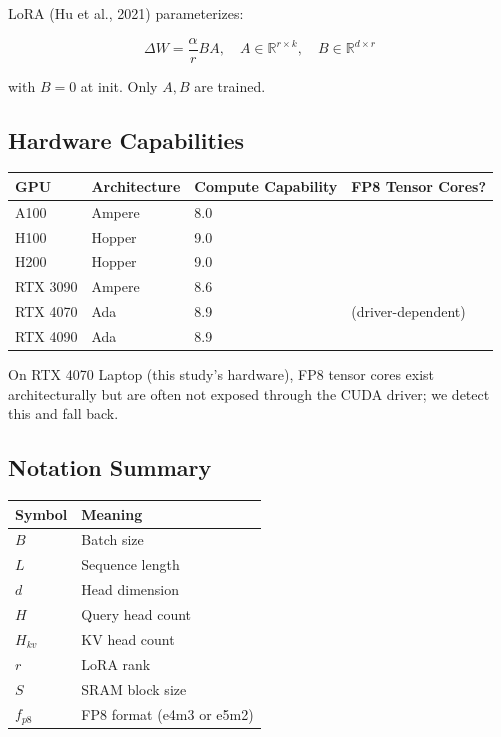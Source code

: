 LoRA (Hu et al., 2021) parameterizes:

\[
\Delta W = \frac{\alpha}{r} BA, \quad
A \in \mathbb{R}^{r \times k}, \quad
B \in \mathbb{R}^{d \times r}
\tag{3.4}
\]

with $B = 0$ at init. Only $A, B$ are trained.

\subsection{Hardware Capabilities}

\begin{table}[H]
\centering
\small
\begin{tabular}{llll}
\toprule
\textbf{GPU} & \textbf{Architecture} & \textbf{Compute Capability} & \textbf{FP8 Tensor Cores?} \\
\midrule
A100 & Ampere & 8.0 &  \\
H100 & Hopper & 9.0 &  \\
H200 & Hopper & 9.0 &  \\
RTX 3090 & Ampere & 8.6 &  \\
RTX 4070 & Ada & 8.9 & (driver-dependent) \\
RTX 4090 & Ada & 8.9 &  \\
\bottomrule
\end{tabular}
\end{table}

On RTX 4070 Laptop (this study's hardware), FP8 tensor cores exist 
architecturally but are often not exposed through the CUDA driver; we 
detect this and fall back.

\subsection{Notation Summary}

\begin{table}[H]
\centering
\small
\begin{tabular}{ll}
\toprule
\textbf{Symbol} & \textbf{Meaning} \\
\midrule
$B$ & Batch size \\
$L$ & Sequence length \\
$d$ & Head dimension \\
$H$ & Query head count \\
$H_{kv}$ & KV head count \\
$r$ & LoRA rank \\
$S$ & SRAM block size \\
$f_{p8}$ & FP8 format (e4m3 or e5m2) \\
\bottomrule
\end{tabular}
\end{table}



